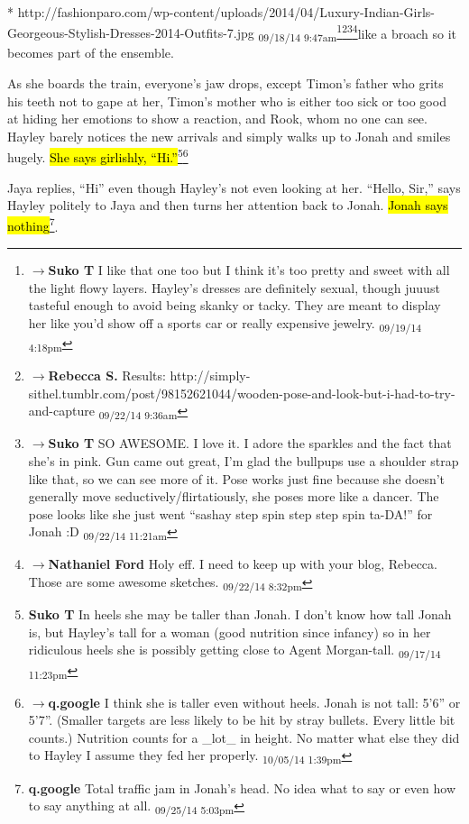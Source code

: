 {* http://fashionparo.com/wp-content/uploads/2014/04/Luxury-Indian-Girls-Georgeous-Stylish-Dresses-2014-Outfits-7.jpg \textsubscript{09/18/14 9:47am}}\footnote{$\rightarrow$\textbf{Suko T }I like that one too but I think it's too pretty and sweet with all the light flowy layers.  Hayley's dresses are definitely sexual, though juuust tasteful enough to avoid being skanky or tacky.  They are meant to display her like you'd show off a sports car or really expensive jewelry. \textsubscript{09/19/14 4:18pm}}\footnote{$\rightarrow$\textbf{Rebecca S. }Results: http://simply-sithel.tumblr.com/post/98152621044/wooden-pose-and-look-but-i-had-to-try-and-capture \textsubscript{09/22/14 9:36am}}\footnote{$\rightarrow$\textbf{Suko T }SO AWESOME.  I love it.  I adore the sparkles and the fact that she's in pink.  Gun came out great, I'm glad the bullpups use a shoulder strap like that, so we can see more of it.  Pose works just fine because she doesn't generally move seductively/flirtatiously, she poses more like a dancer.  The pose looks like she just went ``sashay step spin step step spin ta-DA!'' for Jonah :D \textsubscript{09/22/14 11:21am}}\footnote{$\rightarrow$\textbf{Nathaniel Ford }Holy eff. I need to keep up with your blog, Rebecca. Those are some awesome sketches. \textsubscript{09/22/14 8:32pm}}like a broach so it becomes part of the ensemble.



As she boards the train, everyone's jaw drops, except Timon's father who grits his teeth not to gape at her, Timon's mother who is either too sick or too good at hiding her emotions to show a reaction, and Rook, whom no one can see.  Hayley barely notices the new arrivals and simply walks up to Jonah and smiles hugely. \hl{She says girlishly, ``Hi.''}\footnote{\textbf{Suko T }In heels she may be taller than Jonah.  I don't know how tall Jonah is, but Hayley's tall for a woman (good nutrition since infancy) so in her ridiculous heels she is possibly getting close to Agent Morgan-tall. \textsubscript{09/17/14 11:23pm}}\footnote{$\rightarrow$\textbf{q.google }I think she is taller even without heels.  Jonah is not tall: 5'6'' or 5'7''.  (Smaller targets are less likely to be hit by stray bullets.  Every little bit counts.)  Nutrition counts for a \_lot\_ in height.  No matter what else they did to Hayley I assume they fed her properly. \textsubscript{10/05/14 1:39pm}}

Jaya replies, ``Hi'' even though Hayley's not even looking at her.  ``Hello, Sir,'' says Hayley politely to Jaya and then turns her attention back to Jonah.  \hl{Jonah says nothing}\footnote{\textbf{q.google }Total traffic jam in Jonah's head.  No idea what to say or even how to say anything at all. \textsubscript{09/25/14 5:03pm}}.

